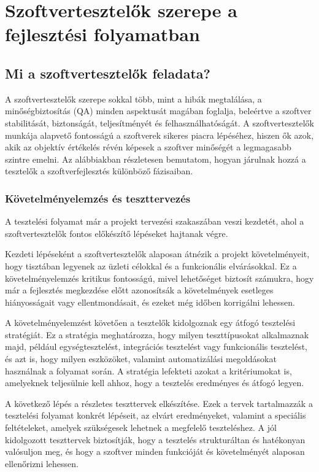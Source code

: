 \section{Szoftvertesztelők szerepe a fejlesztési folyamatban}

\subsection{Mi a szoftvertesztelők feladata?}
A szoftvertesztelők szerepe sokkal több, mint a hibák megtalálása, a minőségbiztosítás (QA) minden aspektusát magában foglalja, beleértve a szoftver stabilitását, biztonságát, teljesítményét és felhasználhatóságát. A szoftvertesztelők munkája alapvető fontosságú a szoftverek sikeres piacra lépéséhez, hiszen ők azok, akik az objektív értékelés révén képesek a szoftver minőségét a legmagasabb szintre emelni. Az alábbiakban részletesen bemutatom, hogyan járulnak hozzá a tesztelők a szoftverfejlesztés különböző fázisaiban.

\subsubsection{Követelményelemzés és teszttervezés}
A tesztelési folyamat már a projekt tervezési szakaszában veszi kezdetét, ahol a szoftvertesztelők fontos előkészítő lépéseket hajtanak végre.

Kezdeti lépéseként a szoftvertesztelők alaposan átnézik a projekt követelményeit, hogy tisztában legyenek az üzleti célokkal és a funkcionális elvárásokkal. Ez a követelményelemzés kritikus fontosságú, mivel lehetőséget biztosít számukra, hogy már a fejlesztés megkezdése előtt azonosítsák a követelmények esetleges hiányosságait vagy ellentmondásait, és ezeket még időben korrigálni lehessen. 

A követelményelemzést követően a tesztelők kidolgoznak egy átfogó tesztelési stratégiát. Ez a stratégia meghatározza, hogy milyen teszttípusokat alkalmaznak majd, például egységtesztelést, integrációs tesztelést vagy funkcionális tesztelést, és azt is, hogy milyen eszközöket, valamint automatizálási megoldásokat használnak a folyamat során. A stratégia lefekteti azokat a kritériumokat is, amelyeknek teljesülnie kell ahhoz, hogy a tesztelés eredményes és átfogó legyen. 

A következő lépés a részletes teszttervek elkészítése. Ezek a tervek tartalmazzák a tesztelési folyamat konkrét lépéseit, az elvárt eredményeket, valamint a speciális feltételeket, amelyek szükségesek lehetnek a megfelelő teszteléshez. A jól kidolgozott teszttervek biztosítják, hogy a tesztelés strukturáltan és hatékonyan valósuljon meg, és hogy a szoftver minden funkcióját és követelményét alaposan ellenőrizni lehessen.

